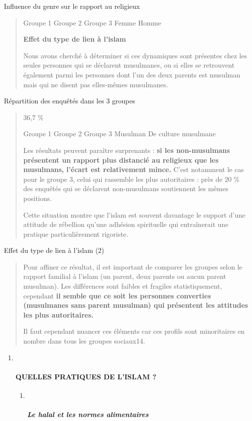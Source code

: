 Influence du genre sur le rapport au religieux

\begin{quote}
Groupe 1 Groupe 2 Groupe 3 Femme Homme

\textbf{Effet du type de lien à l'islam}

Nous avons cherché à déterminer si ces dynamiques sont présentes chez
les seules personnes qui se déclarent musulmanes, ou si elles se
retrouvent également parmi les personnes dont l'un des deux parents est
musulman mais qui ne disent pas elles-mêmes musulmanes.
\end{quote}

Répartition des enquêtés dans les 3 groupes

\begin{quote}
36,7 \%

Groupe 1 Groupe 2 Groupe 3 Musulman De culture musulmane

Les résultats peuvent paraître surprenants : \textbf{si les
non-musulmans présentent un rapport plus distancié au religieux que les
musulmans, l'écart est relativement mince.} C'est notamment le cas pour
le groupe 3, celui qui rassemble les plus autoritaires : près de 20 \%
des enquêtés qui se déclarent non-musulmans soutiennent les mêmes
positions.



Cette situation montre que l'islam est souvent davantage le support
d'une attitude de rébellion qu'une adhésion spirituelle qui entraînerait
une pratique particulièrement rigoriste.
\end{quote}

Effet du type de lien à l'islam (2)

\begin{quote}
Pour affiner ce résultat, il est important de comparer les groupes selon
le rapport familial à l'islam (un parent, deux parents ou aucun parent
musulman). Les différences sont faibles et fragiles statistiquement,
cependant \textbf{il semble que ce soit les personnes converties
(musulmanes sans parent musulman) qui présentent les attitudes les plus
autoritaires.}

Il faut cependant nuancer ces éléments car ces profils sont minoritaires
en nombre dans tous les groupes sociaux14.
\end{quote}

\begin{enumerate}
\def\labelenumi{\arabic{enumi}.}
\item ~
  \hypertarget{quelles-pratiques-de-lislam}{%
  \paragraph{QUELLES PRATIQUES DE L'ISLAM
  ?}\label{quelles-pratiques-de-lislam}}

  \begin{enumerate}
  \def\labelenumii{\arabic{enumii}.}
  \item ~
    \hypertarget{le-halal-et-les-normes-alimentaires}{%
    \subparagraph{Le halal et les normes
    alimentaires}\label{le-halal-et-les-normes-alimentaires}}
  \end{enumerate}
\end{enumerate}

